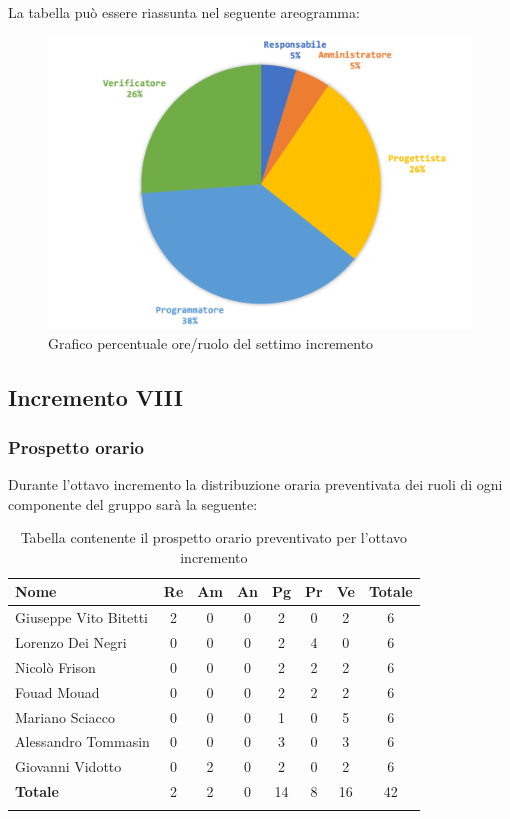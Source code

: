 		La tabella può essere riassunta nel seguente areogramma:
		\begin{figure}[H]
			\centering
			\includegraphics[width=0.8\linewidth]{./images/preventivo/incremento7-2.png}
			\caption{Grafico percentuale ore/ruolo del settimo incremento}
			\label{fig:grafico costi ruolo incremento VII}
		\end{figure}
		
		
		\subsection{Incremento VIII}
		\subsubsection{Prospetto orario}
		Durante l'ottavo incremento la distribuzione oraria preventivata dei ruoli di ogni componente del gruppo sarà la seguente:
		
		\begin{longtable}{|l|c|c|c|c|c|c|c|}
			\hline
			\rowcolor{lighter-grayer}
			\textbf{Nome} & \textbf{Re} & \textbf{Am} & \textbf{An} & \textbf{Pg}  & \textbf{Pr}   & \textbf{Ve} & \textbf{Totale} \\
			\hline
			\endfirsthead
			
			\hline
			Giuseppe Vito Bitetti 		 & 2 & 0 & 0 & 2 & 0 & 2 & 6\\
			\hline
			\hline
			Lorenzo Dei Negri			 & 0 & 0 & 0 & 2 & 4 & 0 & 6\\
			\hline
			\hline
			Nicolò Frison				      & 0 & 0 & 0 & 2 & 2 & 2 & 6\\
			\hline
			\hline
			Fouad Mouad 				   & 0 & 0 & 0 & 2 & 2 & 2 & 6\\
			\hline
			\hline
			Mariano Sciacco 			 & 0 & 0 & 0 & 1 & 0 & 5 & 6\\
			\hline
			\hline
			Alessandro Tommasin    & 0 & 0 & 0 & 3 & 0 & 3 & 6\\
			\hline
			\hline
			Giovanni Vidotto 			  & 0 & 2 & 0 & 2 & 0 & 2 & 6\\
			\hline 
			\textbf{Totale}			 		 & 2 & 2 & 0 & 14 & 8 & 16 & 42\\
			\hline
			\caption{Tabella contenente il prospetto orario preventivato per l'ottavo incremento}
		\end{longtable}
		\pagebreak
		
